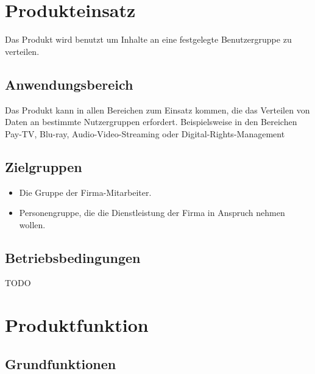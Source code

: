 \documentclass[a4paper,10pt]{scrartcl}
\begin{document}
\section{Produkteinsatz}

Das Produkt wird benutzt um Inhalte an eine festgelegte Benutzergruppe zu verteilen.

\subsection{Anwendungsbereich}

Das Produkt kann in allen Bereichen zum Einsatz kommen, die das Verteilen von Daten an
bestimmte Nutzergruppen erfordert. Beispielsweise in den Bereichen Pay-TV, Blu-ray, Audio-Video-Streaming oder Digital-Rights-Management

\subsection{Zielgruppen}
\begin{itemize}
   \item Die Gruppe der Firma-Mitarbeiter.
   \item Personengruppe, die die Dienstleistung der Firma in Anspruch nehmen wollen.
\end{itemize}

\subsection{Betriebsbedingungen}
TODO

\section{Produktfunktion}

\subsection{Grundfunktionen}
\end{document}
